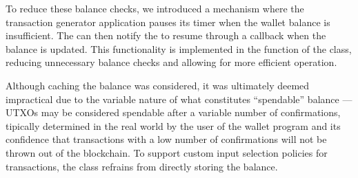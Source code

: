 To reduce these balance checks, we introduced a mechanism where the
transaction generator application pauses its timer when the wallet balance is
insufficient. The  can then notify the 
to resume through a callback when the balance is updated. This functionality is
implemented in the  function of the
 class, reducing unnecessary balance checks and allowing for more
efficient operation.

Although caching the balance was considered, it was ultimately deemed
impractical due to the variable nature of what constitutes ``spendable''
balance --- UTXOs may be considered spendable after a variable number of
confirmations, tipically determined in the real world by the user of the wallet
program and its confidence that transactions with a low number of confirmations
will not be thrown out of the blockchain. To support custom input selection
policies for transactions, the  class refrains from directly
storing the balance.

